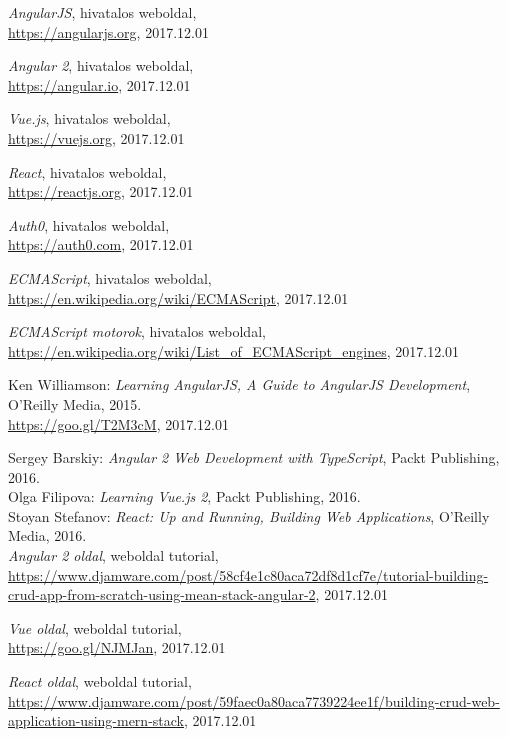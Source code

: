 \begin{thebibliography}{x}

\emph{AngularJS}, hivatalos weboldal, \\
\url{https://angularjs.org}, 2017.12.01

\emph{Angular 2}, hivatalos weboldal, \\
\url{https://angular.io}, 2017.12.01

\emph{Vue.js}, hivatalos weboldal, \\
\url{https://vuejs.org}, 2017.12.01

\emph{React}, hivatalos weboldal, \\
\url{https://reactjs.org}, 2017.12.01

\emph{Auth0}, hivatalos weboldal, \\
\url{https://auth0.com}, 2017.12.01

\emph{ECMAScript}, hivatalos weboldal, \\
\url{https://en.wikipedia.org/wiki/ECMAScript}, 2017.12.01

\emph{ECMAScript motorok}, hivatalos weboldal, \\
\url{https://en.wikipedia.org/wiki/List_of_ECMAScript_engines}, 2017.12.01

Ken Williamson: \emph{Learning AngularJS, A Guide to AngularJS Development}, O'Reilly Media, 2015. \\
\url{https://goo.gl/T2M3cM}, 2017.12.01

Sergey Barskiy: \emph{Angular 2 Web Development with TypeScript}, Packt Publishing, 2016. \\

Olga Filipova: \emph{Learning Vue.js 2}, Packt Publishing, 2016. \\

Stoyan Stefanov: \emph{React: Up and Running, Building Web Applications}, O'Reilly Media, 2016. \\


\emph{Angular 2 oldal}, weboldal tutorial, \\
\url{https://www.djamware.com/post/58cf4e1c80aca72df8d1cf7e/tutorial-building-crud-app-from-scratch-using-mean-stack-angular-2}, 2017.12.01

\emph{Vue oldal}, weboldal tutorial, \\
\url{https://goo.gl/NJMJan}, 2017.12.01

\emph{React oldal}, weboldal tutorial, \\
\url{https://www.djamware.com/post/59faec0a80aca7739224ee1f/building-crud-web-application-using-mern-stack}, 2017.12.01






\end{thebibliography}

